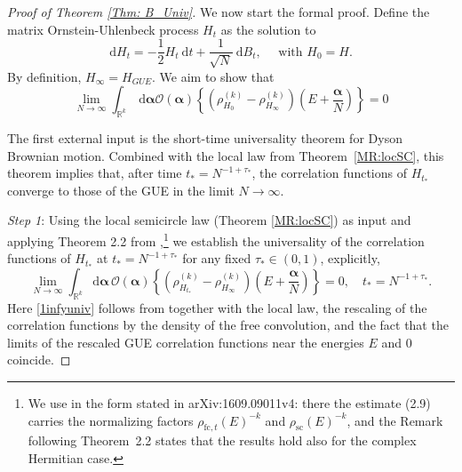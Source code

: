 \documentclass[10pt,reqno]{article}
\theoremstyle{plain} %
\theoremstyle{remark}
\numberwithin{equation}{section}
\begin{document}
\begin{proof}[Proof of Theorem \ref{Thm: B_Univ}]
We now start the formal proof.  
Define  the matrix Ornstein-Uhlenbeck process $H_t$ as the solution to
\begin{equation}\label{defUnivHt}
\mathrm{d} H_t=-\frac{1}{2} H_t \mathrm{~d} t+\frac{1}{\sqrt{N}} \mathrm{~d} B_t, \quad \text { with } H_0=H.   
\end{equation}
By definition, $H_\infty=H_{GUE}$. We aim to  show that 
\begin{equation}\label{0infy}
\lim _{N \rightarrow \infty} \int_{\mathbb{R}^k} \mathrm{~d} \boldsymbol{\alpha} \mathcal{O}(\boldsymbol{\alpha})\left\{\left(\rho_{H_0}^{(k)}-\rho_{H_\infty}^{(k)}\right)\left(E+\frac{\boldsymbol{\alpha}}{N}\right)\right\}=0 
 \end{equation}  


\medskip 
\noindent 
\begingroup
The first external input is the short-time universality theorem for Dyson
Brownian motion. Combined with the local law from Theorem~\ref*{MR:locSC}, this theorem implies that,
after time \(t_*=N^{-1+\tau_*}\), the correlation functions of
\(H_{t_*}\) converge to those of  the GUE in the limit  $N \to \infty$.
\par\endgroup

\medskip 
\noindent 
\emph{Step 1}: Using the local semicircle law (Theorem \ref{MR:locSC}) as input and applying Theorem 2.2 from \cite{LANDON20191137},\footnote{We use \cite[Theorem~2.2]{LANDON20191137} in the form stated in arXiv:1609.09011v4: there the estimate (2.9) carries the normalizing factors $\rho_{\mathrm{fc},t}(E)^{-k}$ and $\rho_{\mathrm{sc}}(E)^{-k}$, and the Remark following Theorem~2.2 states that the results hold also for the complex Hermitian case.} we establish the universality of the correlation functions of $H_{t_*}$ at $t_*=N^{-1+\tau_*}$ for any fixed $\tau_*\in(0,1)$, explicitly,
\begin{equation}\label{1infyuniv}
\lim_{N \rightarrow \infty} \int_{\mathbb{R}^k} \mathrm{d} \boldsymbol{\alpha}\, \mathcal{O}(\boldsymbol{\alpha}) \left\{\left(\rho_{H_{t_*}}^{(k)} - \rho_{H_\infty}^{(k)}\right)\left(E+\frac{\boldsymbol{\alpha}}{N}\right)\right\}=0,\quad t_*=N^{-1+\tau_*}.
\end{equation}
Here \eqref{1infyuniv} follows from \cite[Theorem~2.2]{LANDON20191137} together with the local law, the rescaling of the correlation functions by the density of the free convolution, and the fact that the limits of the rescaled GUE correlation functions near the energies $E$ and $0$ coincide.



\end{proof}
\end{document}
